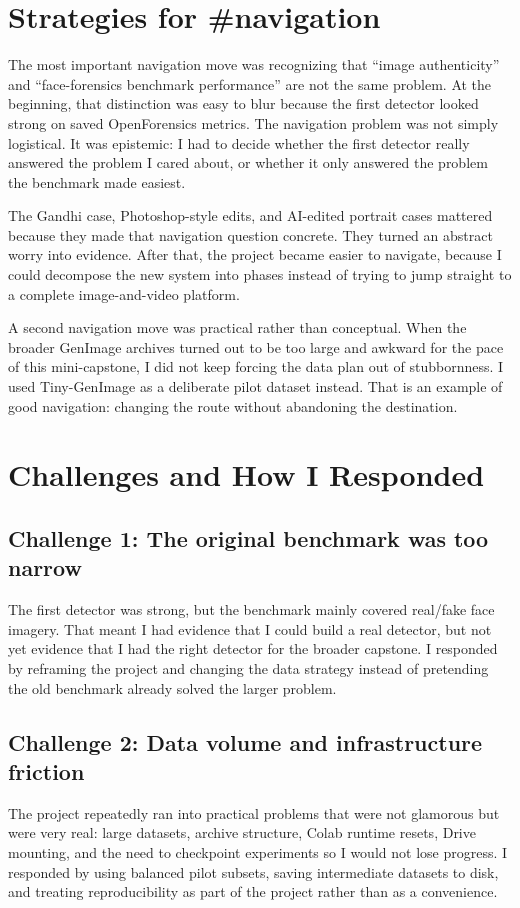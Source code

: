 \documentclass[11pt]{article}
\begin{document}
\section{Strategies for \#navigation}

The most important navigation move was recognizing that ``image authenticity'' and ``face-forensics benchmark performance'' are not the same problem. At the beginning, that distinction was easy to blur because the first detector looked strong on saved OpenForensics metrics. The navigation problem was not simply logistical. It was epistemic: I had to decide whether the first detector really answered the problem I cared about, or whether it only answered the problem the benchmark made easiest.

The Gandhi case, Photoshop-style edits, and AI-edited portrait cases mattered because they made that navigation question concrete. They turned an abstract worry into evidence. After that, the project became easier to navigate, because I could decompose the new system into phases instead of trying to jump straight to a complete image-and-video platform.

A second navigation move was practical rather than conceptual. When the broader GenImage archives turned out to be too large and awkward for the pace of this mini-capstone, I did not keep forcing the data plan out of stubbornness. I used Tiny-GenImage as a deliberate pilot dataset instead. That is an example of good navigation: changing the route without abandoning the destination.

\section{Challenges and How I Responded}

\subsection{Challenge 1: The original benchmark was too narrow}
The first detector was strong, but the benchmark mainly covered real/fake face imagery. That meant I had evidence that I could build a real detector, but not yet evidence that I had the right detector for the broader capstone. I responded by reframing the project and changing the data strategy instead of pretending the old benchmark already solved the larger problem.

\subsection{Challenge 2: Data volume and infrastructure friction}
The project repeatedly ran into practical problems that were not glamorous but were very real: large datasets, archive structure, Colab runtime resets, Drive mounting, and the need to checkpoint experiments so I would not lose progress. I responded by using balanced pilot subsets, saving intermediate datasets to disk, and treating reproducibility as part of the project rather than as a convenience.
\end{document}
